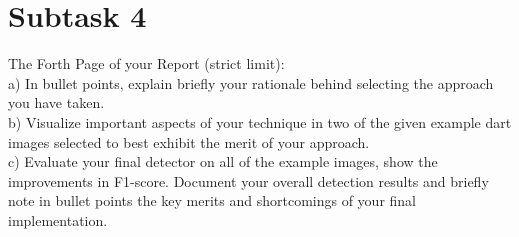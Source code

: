 \documentclass[conference]{IEEEtran}
\begin{document}
\section{Subtask 4}

The Forth Page of your Report (strict limit):\\
a) In bullet points, explain briefly your rationale behind
selecting the approach you have taken.\\
b) Visualize important aspects of your technique in two of
the given example dart images selected to best exhibit the
merit of your approach.\\
c) Evaluate your final detector on all of the example images,
show the improvements in F1-score. Document your
overall detection results and briefly note in bullet points
the key merits and shortcomings of your final
implementation.
\end{document}
